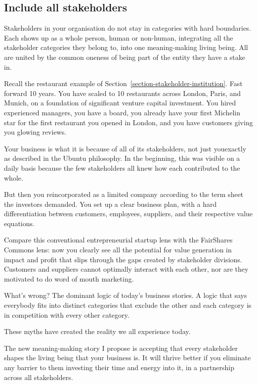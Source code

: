 \subsection{Include all stakeholders}
Stakeholders in your organisation do not stay in categories with hard boundaries. Each shows up as a whole person, human or non-human, integrating all the stakeholder categories they belong to, into one meaning\hyp{}making living being. All are united by the common oneness of being part of the entity they have a stake in.


Recall the restaurant example of Section~\ref{section-stakeholder-institution}.
Fast forward 10 years. You have scaled to 10 restaurants across London, Paris, and Munich, on a foundation of significant venture capital investment. You hired experienced managers, you have a board, you already have your first Michelin star for the first restaurant you opened in London, and you have customers giving you glowing reviews.


Your business is what it is because of all of its stakeholders, not just you\textemdash exactly as described in the Ubuntu philosophy. In the beginning, this was visible on a daily basis because the few stakeholders all knew how each contributed to the whole.


But then you reincorporated as a limited company according to the term sheet the investors demanded. You set up a clear business plan, with a hard differentiation between customers, employees, suppliers, and their respective value equations. 


Compare this conventional entrepreneurial startup lens with the FairShares Commons lens: now you clearly see all the potential for value generation in impact and profit that slips through the gaps created by stakeholder divisions. Customers and suppliers cannot optimally interact with each other, nor are they motivated to do word of mouth marketing.


What's wrong? The dominant logic of today's business stories. A logic that says everybody fits into distinct categories that exclude the other and each category is in competition with every other category. 


These myths have created the reality we all experience today.


The new meaning\hyp{}making story I propose is accepting that every stakeholder shapes the living being that your business is. It will thrive better if you eliminate any barrier to them investing their time and energy into it, in a partnership across all stakeholders. 


